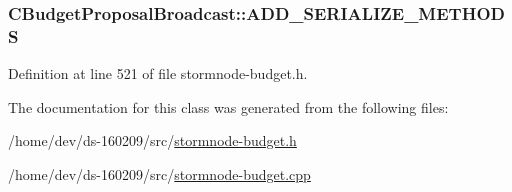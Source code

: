 \subsubsection[{A\+D\+D\+\_\+\+S\+E\+R\+I\+A\+L\+I\+Z\+E\+\_\+\+M\+E\+T\+H\+O\+D\+S}]{\setlength{\rightskip}{0pt plus 5cm}C\+Budget\+Proposal\+Broadcast\+::\+A\+D\+D\+\_\+\+S\+E\+R\+I\+A\+L\+I\+Z\+E\+\_\+\+M\+E\+T\+H\+O\+D\+S}\label{class_c_budget_proposal_broadcast_ad5372e24fcfa7ba233702140908fd0f6}


Definition at line 521 of file stormnode-\/budget.\+h.



The documentation for this class was generated from the following files\+:\begin{DoxyCompactItemize}
\item 
/home/dev/ds-\/160209/src/\hyperlink{stormnode-budget_8h}{stormnode-\/budget.\+h}\item 
/home/dev/ds-\/160209/src/\hyperlink{stormnode-budget_8cpp}{stormnode-\/budget.\+cpp}\end{DoxyCompactItemize}
